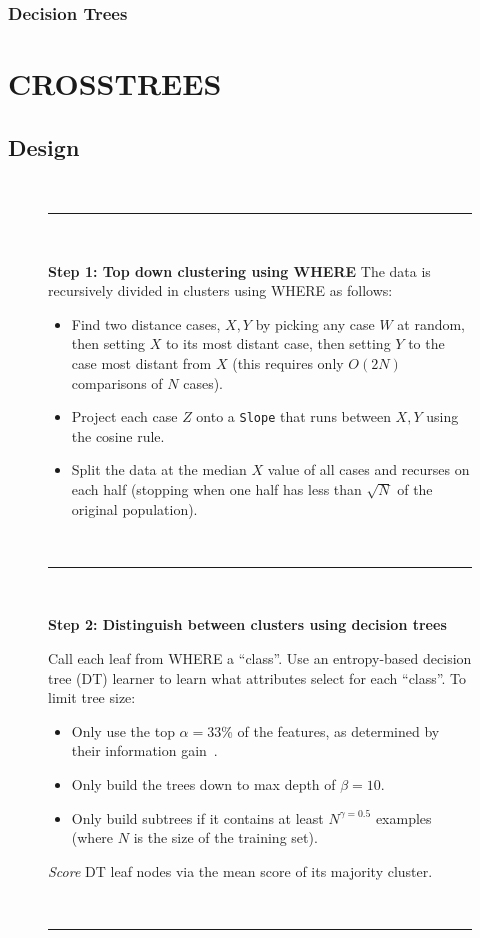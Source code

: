 \documentclass{sig-alternate}
\newcommand{\bi}{\begin{itemize}[leftmargin=0.4cm]}
\newcommand{\ei}{\end{itemize}}
\begin{document}
\subsubsection{Decision Trees}


\section{CROSSTREES}
\subsection{Design}
	\begin{figure}[t]
		\small
		~\hrule~
		
		{\bf Step 1: Top down clustering using WHERE}
		The data is recursively divided in clusters using WHERE as follows:
		\begin{itemize}
			
			\item Find   two   distance cases,  $X,Y$
			by picking any case $W$ at random, then setting $X$ to its most
			distant case, then setting $Y$ to the case most distant from
			$X$
			(this requires only $O(2N)$ comparisons
			of $N$ cases).
			\item Project each case $Z$
			onto a {\tt Slope} that  runs between $X,Y$ using the cosine
			rule. 
			\item Split the data at the median $X$ value of all cases and
			recurses on each half  (stopping when
			one half has less  than $\sqrt{N}$ of the original population).
		\end{itemize}		

		~\hrule~
		
		{\bf Step 2: Distinguish between clusters using  decision trees}
		
		Call each leaf from WHERE a  ``class''. Use an entropy-based
		 decision tree (DT) learner to learn what attributes select for each ``class''. To limit tree size:
		 \bi
		 \item Only use the top $\alpha=33$\%  of the features, as determined by their information gain~\cite{Irani1993}. 
		 \item Only build the trees down to  max depth of $\beta=10$.
		 \item Only build subtrees if it contains at least $N^{\gamma=0.5}$ examples (where $N$ is the size of the training set).
\ei
{\em Score}  DT  leaf nodes  via the mean score of its majority cluster. 
		
		~\hrule~
		

\end{figure}
\end{document}
